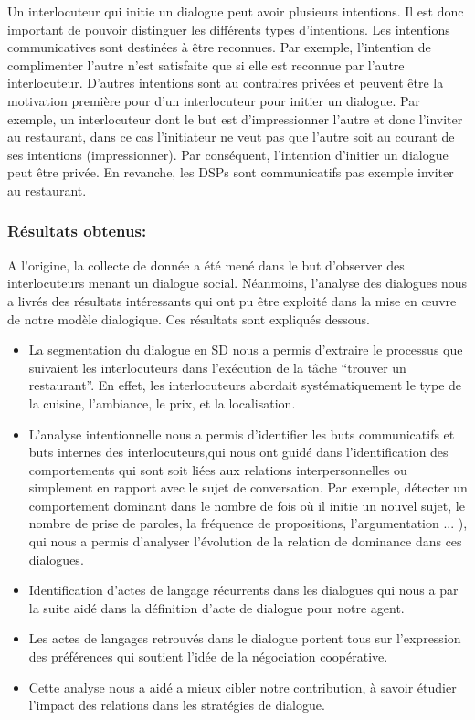 \documentclass[a4paper,french]{article}
\begin{document}
\par Un interlocuteur qui initie un dialogue peut avoir plusieurs intentions. Il est donc important de pouvoir distinguer les différents types d'intentions. Les intentions communicatives sont destinées à être reconnues. Par exemple, l'intention de complimenter l'autre n'est satisfaite que si elle est reconnue par l'autre interlocuteur. D'autres intentions sont au contraires privées et peuvent être la motivation première pour d'un interlocuteur pour initier un dialogue. Par exemple, un interlocuteur dont le but est d'impressionner l'autre et donc l'inviter au restaurant, dans ce cas l'initiateur ne veut pas que l'autre soit au courant de ses intentions (impressionner). Par conséquent, l'intention d'initier un dialogue peut être privée. En revanche, les DSPs sont communicatifs pas exemple inviter au restaurant. 

\subsubsection{Résultats obtenus:}
\par A l'origine, la collecte de donnée a été mené dans le but d'observer des interlocuteurs menant un dialogue social. Néanmoins, l'analyse des dialogues nous a livrés des résultats intéressants qui ont pu être exploité dans la mise en œuvre de notre modèle dialogique.  Ces résultats sont expliqués dessous.

\begin{itemize}

		\item  La segmentation du dialogue en SD nous a permis d'extraire le processus que suivaient les interlocuteurs dans l'exécution de la tâche  ``trouver un restaurant''. En effet, les interlocuteurs abordait systématiquement le type de la cuisine, l'ambiance, le prix, et la localisation. 
		
		\item L'analyse intentionnelle nous a permis d'identifier les buts communicatifs et buts internes des interlocuteurs,qui nous ont guidé dans l'identification des comportements qui sont soit liées aux relations interpersonnelles ou simplement en rapport avec le sujet de conversation. Par exemple, détecter un comportement dominant dans le nombre de fois où il initie un nouvel sujet, le nombre de prise de paroles, la fréquence de propositions, l'argumentation ... ), qui nous a permis d'analyser l'évolution de la relation de dominance dans ces dialogues. 
		\item Identification d'actes de langage récurrents dans les dialogues qui nous a par la suite aidé dans la définition d'acte de dialogue pour notre agent.	
		\item Les actes de langages retrouvés dans le dialogue portent tous sur l'expression des préférences qui soutient l'idée de la négociation coopérative.
		\item Cette analyse nous a aidé a mieux cibler notre contribution, à savoir étudier l'impact des relations dans les stratégies de dialogue.

	
	
\end{itemize}
\end{document}
